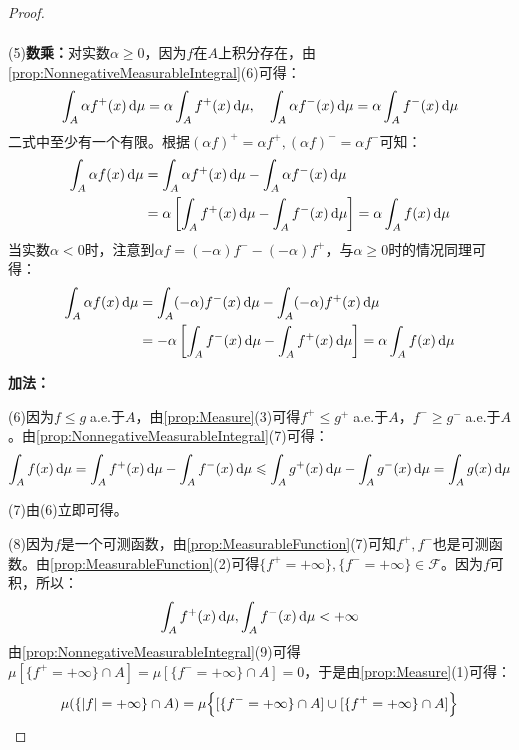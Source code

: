 \begin{proof}
\begin{gather*}
	\end{gather*}\par
	(5)\textbf{数乘：}对实数$\alpha\geqslant0$，因为$f$在$A$上积分存在，由\cref{prop:NonnegativeMeasurableIntegral}(6)可得：
	\begin{equation*}
		\int_{A}\alpha f^+(x)\mathop{}\!\mathrm{d}\mu=\alpha\int_{A}f^+(x)\mathop{}\!\mathrm{d}\mu,\quad\int_{A}\alpha f^-(x)\mathop{}\!\mathrm{d}\mu=\alpha\int_{A}f^-(x)\mathop{}\!\mathrm{d}\mu
	\end{equation*}
	二式中至少有一个有限。根据$(\alpha f)^+=\alpha f^+,(\alpha f)^-=\alpha f^-$可知：
	\begin{align*}
		\int_{A}\alpha f(x)\mathop{}\!\mathrm{d}\mu&=\int_{A}\alpha f^+(x)\mathop{}\!\mathrm{d}\mu-\int_{A}\alpha f^-(x)\mathop{}\!\mathrm{d}\mu \\
		&=\alpha\left[\int_{A}f^+(x)\mathop{}\!\mathrm{d}\mu-\int_{A}f^-(x)\mathop{}\!\mathrm{d}\mu\right]=\alpha\int_{A}f(x)\mathop{}\!\mathrm{d}\mu
	\end{align*}
	当实数$\alpha<0$时，注意到$\alpha f=(-\alpha)f^--(-\alpha)f^+$，与$\alpha\geqslant0$时的情况同理可得：
	\begin{align*}
		\int_{A}\alpha f(x)\mathop{}\!\mathrm{d}\mu&=\int_{A}(-\alpha)f^-(x)\mathop{}\!\mathrm{d}\mu-\int_{A}(-\alpha)f^+(x)\mathop{}\!\mathrm{d}\mu \\
		&=-\alpha\left[\int_{A}f^-(x)\mathop{}\!\mathrm{d}\mu-\int_{A}f^+(x)\mathop{}\!\mathrm{d}\mu\right]=\alpha\int_{A}f(x)\mathop{}\!\mathrm{d}\mu
	\end{align*}\par
	\textbf{加法：}\par
	(6)因为$f\leqslant g\;$a.e.于$A$，由\cref{prop:Measure}(3)可得$f^+\leqslant g^+\;$a.e.于$A$，$f^-\geqslant g^-\;$a.e.于$A$。由\cref{prop:NonnegativeMeasurableIntegral}(7)可得：
	\begin{equation*}
		\int_{A}f(x)\mathop{}\!\mathrm{d}\mu=\int_{A}f^+(x)\mathop{}\!\mathrm{d}\mu-\int_{A}f^-(x)\mathop{}\!\mathrm{d}\mu\leqslant\int_{A}g^+(x)\mathop{}\!\mathrm{d}\mu-\int_{A}g^-(x)\mathop{}\!\mathrm{d}\mu=\int_{A}g(x)\mathop{}\!\mathrm{d}\mu
	\end{equation*}
	\par
	(7)由(6)立即可得。\par
	(8)因为$f$是一个可测函数，由\cref{prop:MeasurableFunction}(7)可知$f^+,f^-$也是可测函数。由\cref{prop:MeasurableFunction}(2)可得$\{f^+=+\infty\},\{f^-=+\infty\}\in \mathscr{F}$。因为$f$可积，所以：
	\begin{equation*}
		\int_{A}f^+(x)\mathop{}\!\mathrm{d}\mu,\int_{A}f^-(x)\mathop{}\!\mathrm{d}\mu<+\infty
	\end{equation*}
	由\cref{prop:NonnegativeMeasurableIntegral}(9)可得$\mu[\{f^+=+\infty\}\cap A]=\mu[\{f^-=+\infty\}\cap A]=0$，于是由\cref{prop:Measure}(1)可得：
	\begin{align*}
		\mu(\{|f|=+\infty\}\cap A)&=\mu\Bigl\{[\{f^-=+\infty\}\cap A]\cup[\{f^+=+\infty\}\cap A]\Bigr\} \\

\end{align*}
\end{proof}
